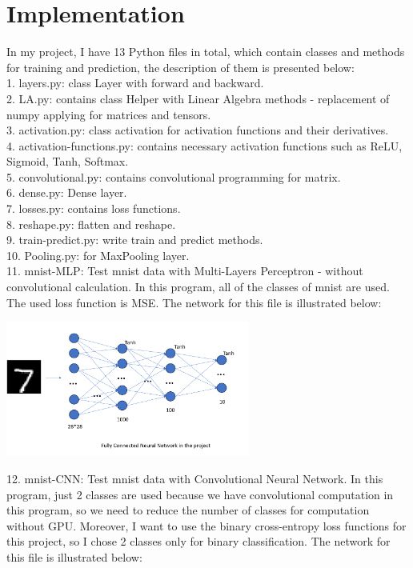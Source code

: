 \documentclass{article}
\begin{document}
\section{Implementation}
In my project, I have 13 Python files in total, which contain classes and methods for training and prediction, the description of them is presented below: \\
1. layers.py: class Layer with forward and backward. \\
2. LA.py: contains class Helper with Linear Algebra methods - replacement of numpy applying for matrices and tensors. \\
3. activation.py: class activation for activation functions and their derivatives. \\
4. activation-functions.py: contains necessary activation functions such as ReLU, Sigmoid, Tanh, Softmax. \\
5. convolutional.py: contains convolutional programming for matrix. \\
6. dense.py: Dense layer. \\
7. losses.py: contains loss functions. \\
8. reshape.py: flatten and reshape. \\
9. train-predict.py: write train and predict methods. \\
10. Pooling.py: for MaxPooling layer. \\
11. mnist-MLP: Test mnist data with Multi-Layers Perceptron - without convolutional calculation. In this program, all of the classes of mnist are used. The used loss function is MSE. The network for this file is illustrated below:
\begin{center}
    \includegraphics[width=0.6\textwidth]{FullyConnectedNN.PNG}
\end{center}
12. mnist-CNN: Test mnist data with Convolutional Neural Network. In this program, just 2 classes are used because we have convolutional computation in this program, so we need to reduce the number of classes for computation without GPU. Moreover, I want to use the binary cross-entropy loss functions for this project, so I chose 2 classes only for binary classification. The network for this file is illustrated below:
\end{document}
